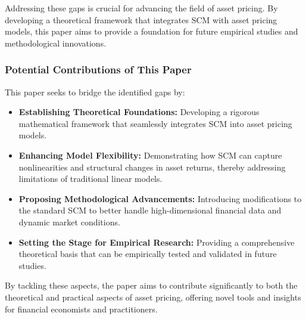 Addressing these gaps is crucial for advancing the field of asset pricing. By developing a theoretical framework that integrates SCM with asset pricing models, this paper aims to provide a foundation for future empirical studies and methodological innovations.

\subsubsection{Potential Contributions of This Paper}
This paper seeks to bridge the identified gaps by:
\begin{itemize}
    \item \textbf{Establishing Theoretical Foundations:} Developing a rigorous mathematical framework that seamlessly integrates SCM into asset pricing models.
    \item \textbf{Enhancing Model Flexibility:} Demonstrating how SCM can capture nonlinearities and structural changes in asset returns, thereby addressing limitations of traditional linear models.
    \item \textbf{Proposing Methodological Advancements:} Introducing modifications to the standard SCM to better handle high-dimensional financial data and dynamic market conditions.
    \item \textbf{Setting the Stage for Empirical Research:} Providing a comprehensive theoretical basis that can be empirically tested and validated in future studies.
\end{itemize}

By tackling these aspects, the paper aims to contribute significantly to both the theoretical and practical aspects of asset pricing, offering novel tools and insights for financial economists and practitioners.

